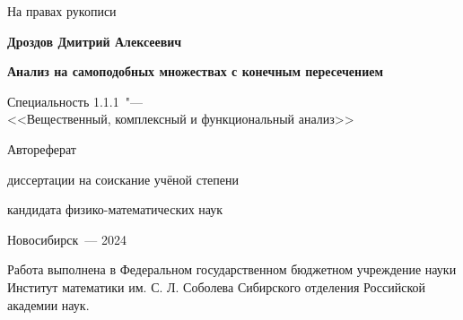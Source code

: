 \documentclass[a5paper,9pt,twoside]{extarticle} %
\begin{document}
\thispagestyle{empty}

\noindent\hfill\large{На правах рукописи}\\


\vspace{0pt plus1fill}
\begin{center}
\textbf {\large Дроздов Дмитрий Алексеевич}
\end{center}

\vspace{0pt plus3fill}
\begin{center}
\textbf {\Large Анализ на самоподобных множествах с конечным пересечением}

\vspace{0pt plus3fill}
{\large Специальность 1.1.1\ "---\\
<<Вещественный, комплексный и функциональный анализ>>}


\vspace{0pt plus1.5fill}
\Large{Автореферат}\par
\large{диссертации на соискание учёной степени\par кандидата физико-математических наук}
\end{center}

\vspace{0pt plus4fill}
{\centering Новосибирск~--- 2024\par}

\newpage
\thispagestyle{empty}
\noindent Работа выполнена в {Федеральном государственном бюджетном учреждение науки
Институт математики им. С. Л. Соболева Сибирского отделения Российской академии наук}.
\end{document}
